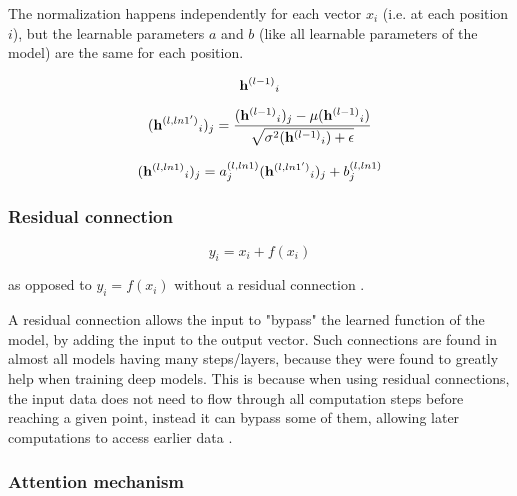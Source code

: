 The normalization happens independently for each vector $x_i$ (i.e. at each position $i$), but the learnable parameters $a$ and $b$ (like all learnable parameters of the model) are the same for each position.


\begin{equation}
	{\mathbf{h}^{(l-1)}}_i
	\label{eq:layernorm_in}
\end{equation}

\begin{equation}
	({\mathbf{h}^{(l, ln1')}}_i)_j = \frac
	{({\mathbf{h}^{(l-1)}}_i)_j - \mu({\mathbf{h}^{(l-1)}}_i)}
	{\sqrt {\sigma^2({\mathbf{h}^{(l-1)}}_i)+\epsilon}}
	\label{eq:layernorm_mid}
\end{equation}

\begin{equation}
	({\mathbf{h}^{(l, ln1)}}_i)_j = a^{(l, ln1)}_j ({\mathbf{h}^{(l, ln1')}}_i)_j + b^{(l, ln1)}_j
	\label{eq:layernorm_out}
\end{equation}


\subsubsection{Residual connection}
\label{gpt2:residual}

\begin{samepage}

$$y_i = x_i + f(x_i)$$

as opposed to $y_i = f(x_i)$ without a residual connection  \cite{residual}.

A residual connection allows the input to "bypass" the learned function of the model, by adding the input to the output vector.
Such connections are found in almost all models having many steps/layers, because they were found to greatly help when training deep models.
This is because when using residual connections, the input data does not need to flow through all computation steps before reaching a given point, instead it can bypass some of them, allowing later computations to access earlier data .

\end{samepage}

\subsubsection{Attention mechanism}
\label{gpt2_attn}

